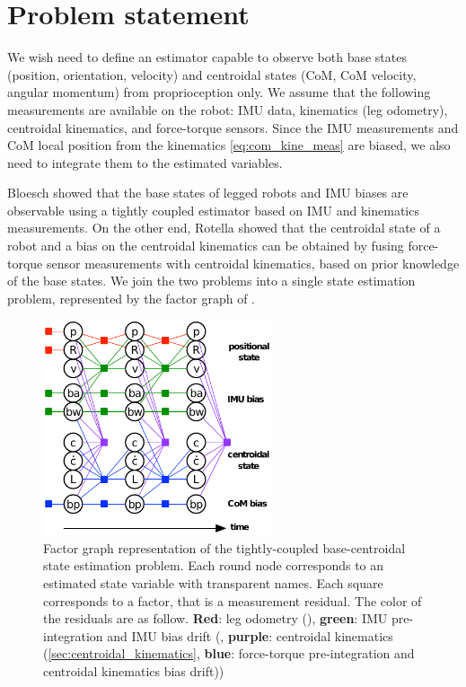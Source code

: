 \section{Problem statement}

We wish need to define an estimator capable to observe both base states (position, orientation, velocity) and centroidal states (CoM, CoM velocity, angular momentum) from proprioception
only. We assume that the following measurements are available on the robot: IMU data, kinematics (leg odometry), centroidal kinematics, and force-torque sensors. 
Since the IMU measurements  and CoM local position from the kinematics \eqref{eq:com_kine_meas} are biased, we also need to integrate them to the estimated
variables.

Bloesch \cite{bloesch2013state} showed that the base states of legged robots and IMU biases are observable using a tightly coupled estimator based on IMU and kinematics measurements.
On the other end, Rotella \cite{rotella2015humanoid} showed that the centroidal state of a robot and a bias on the centroidal kinematics can be obtained by fusing 
force-torque sensor measurements with centroidal kinematics, based on prior knowledge of the base states. We join the two problems into a single state estimation problem, 
represented by the factor graph of .  

\begin{figure}[h]
    \centering
    \includegraphics[width=0.6\textwidth]{figures/centroidal/centroidal_factor_graph.pdf}
    \caption{Factor graph representation of the tightly-coupled base-centroidal state estimation problem.
             Each round node corresponds to an estimated state variable with transparent names. Each square corresponds to a factor, that is a measurement residual.
             The color of the residuals are as follow. \textbf{Red}: leg odometry (), \textbf{green}: IMU pre-integration and IMU bias drift 
             (, \textbf{purple}: centroidal kinematics (\ref{sec:centroidal_kinematics}, \textbf{blue}: force-torque pre-integration and
             centroidal kinematics bias drift))
             }
    \label{fig:centroidal_factor_graph}
\end{figure}


